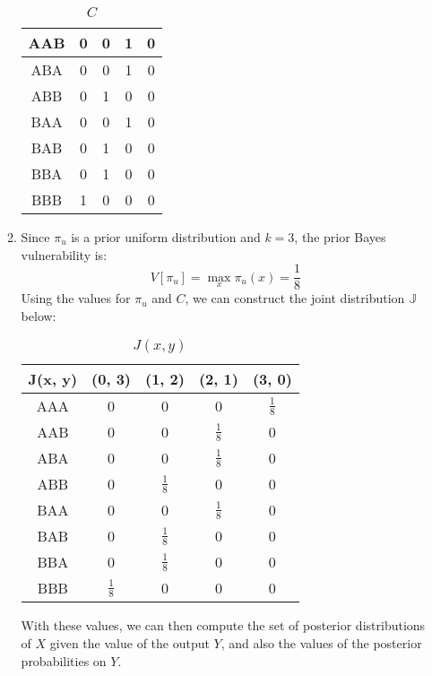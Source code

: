 \documentclass{article}
\begin{document}
\begin{enumerate}
\begin{enumerate}
\begin{table}[H]
\begin{tabular}{|c|c|c|c|c|}
				            AAB & 0      & 0      & 1      & 0      \\ \hline
				            ABA & 0      & 0      & 1      & 0      \\ \hline
				            ABB & 0      & 1      & 0      & 0      \\ \hline
				            BAA & 0      & 0      & 1      & 0      \\ \hline
				            BAB & 0      & 1      & 0      & 0      \\ \hline
				            BBA & 0      & 1      & 0      & 0      \\ \hline
				            BBB & 1      & 0      & 0      & 0      \\ \hline
			            \end{tabular}
			            \caption{\(C\)}
		            \end{table}
		      \item Since \(\pi_u\) is a prior uniform distribution and \(k = 3\), the prior Bayes vulnerability is:
		            \[V[\pi_u] = \max_x \pi_u(x) = \frac{1}{8}\]
		            Using the values for \(\pi_u\) and \(C\), we can construct the joint distribution \(\mathbb{J}\) below:
		            \begin{table}[H]
			            \centering
			            \begin{tabular}{|c|c|c|c|c|}
				            \hline
				            J(x, y) & (0, 3)        & (1, 2)        & (2, 1)        & (3, 0)        \\ \hline
				            AAA     & 0             & 0             & 0             & $\frac{1}{8}$ \\ \hline
				            AAB     & 0             & 0             & $\frac{1}{8}$ & 0             \\ \hline
				            ABA     & 0             & 0             & $\frac{1}{8}$ & 0             \\ \hline
				            ABB     & 0             & $\frac{1}{8}$ & 0             & 0             \\ \hline
				            BAA     & 0             & 0             & $\frac{1}{8}$ & 0             \\ \hline
				            BAB     & 0             & $\frac{1}{8}$ & 0             & 0             \\ \hline
				            BBA     & 0             & $\frac{1}{8}$ & 0             & 0             \\ \hline
				            BBB     & $\frac{1}{8}$ & 0             & 0             & 0             \\ \hline
			            \end{tabular}
			            \caption{\(J(x, y)\)}
		            \end{table}
		            With these values, we can then compute the set of posterior distributions of \(X\) given the value
		            of the output \(Y\), and also the values of the posterior probabilities on \(Y\).


\end{enumerate}
\end{enumerate}
\end{document}
